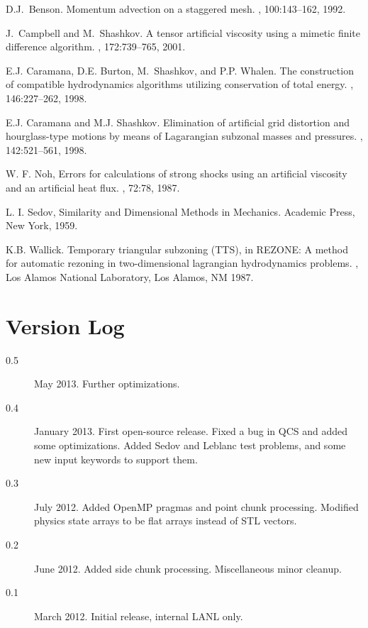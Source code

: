 \documentclass[11pt,letterpaper]{article} %
\begin{document}
\begin{thebibliography}{9}


D.J.~Benson.
\newblock Momentum advection on a staggered mesh.
, 100:143--162, 1992.

J.~Campbell and M.~Shashkov.
\newblock A tensor artificial viscosity using a mimetic finite difference
  algorithm.
, 172:739--765, 2001.

E.J. Caramana, D.E. Burton, M.~Shashkov, and P.P. Whalen.
\newblock The construction of compatible hydrodynamics algorithms utilizing
  conservation of total energy.
, 146:227--262, 1998.

E.J. Caramana and M.J. Shashkov.
\newblock Elimination of artificial grid distortion and hourglass-type motions
  by means of {L}agarangian subzonal masses and pressures.
, 142:521--561, 1998.

W. F. Noh,
\newblock Errors for calculations of strong shocks using an artificial viscosity and an artificial heat flux.
, 72:78, 1987.

L. I. Sedov,
\newblock Similarity and Dimensional Methods in Mechanics.
\newblock Academic Press, New York, 1959.

K.B. Wallick.
\newblock Temporary triangular subzoning ({TTS}), in {REZONE}: A method for
  automatic rezoning in two-dimensional lagrangian hydrodynamics problems.
, Los Alamos National Laboratory, Los
  Alamos, NM 1987.

\end{thebibliography}

\appendix
\section{Version Log}

\begin{description}
\item[0.5] May 2013.  Further optimizations.
\item[0.4] January 2013.  First open-source release.
Fixed a bug in QCS and added some optimizations.
Added Sedov and Leblanc test problems, and some new input keywords to
support them.
\item[0.3] July 2012.  Added OpenMP pragmas and point chunk processing.
Modified physics state arrays to be flat arrays instead of STL vectors.
\item[0.2] June 2012.  Added side chunk processing.  Miscellaneous minor cleanup.
\item[0.1] March 2012.  Initial release, internal LANL only.
\end{description}
\end{document}

